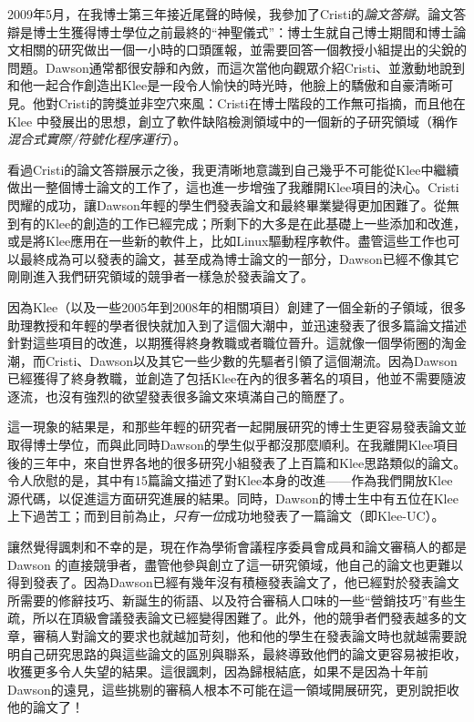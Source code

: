 \documentclass[12pt,UTF8,nofonts]{book}
\begin{document}
\breakline

2009年5月，在我博士第三年接近尾聲的時候，我參加了Cristi的\emph{論文答辯}。論文答辯是博士生獲得博士學位之前最終的“神聖儀式”：博士生就自己博士期間和博士論文相關的研究做出一個一小時的口頭匯報，並需要回答一個教授小組提出的尖銳的問題。Dawson通常都很安靜和內斂，而這次當他向觀眾介紹Cristi、並激動地說到和他一起合作創造出Klee是一段令人愉快的時光時，他臉上的驕傲和自豪清晰可見。他對Cristi的誇獎並非空穴來風：Cristi在博士階段的工作無可指摘，而且他在Klee 中發展出的思想，創立了軟件缺陷檢測領域中的一個新的子研究領域（稱作\emph{混合式實際/符號化程序運行}）。

看過Cristi的論文答辯展示之後，我更清晰地意識到自己幾乎不可能從Klee中繼續做出一整個博士論文的工作了，這也進一步增強了我離開Klee項目的決心。Cristi 閃耀的成功，讓Dawson年輕的學生們發表論文和最終畢業變得更加困難了。從無到有的Klee的創造的工作已經完成；所剩下的大多是在此基礎上一些添加和改進，或是將Klee應用在一些新的軟件上，比如Linux驅動程序軟件。盡管這些工作也可以最終成為可以發表的論文，甚至成為博士論文的一部分，Dawson已經不像其它剛剛進入我們研究領域的競爭者一樣急於發表論文了。

因為Klee（以及一些2005年到2008年的相關項目）創建了一個全新的子領域，很多助理教授和年輕的學者很快就加入到了這個大潮中，並迅速發表了很多篇論文描述針對這些項目的改進，以期獲得終身教職或者職位晉升。這就像一個學術圈的淘金潮，而Cristi、Dawson以及其它一些少數的先驅者引領了這個潮流。因為Dawson已經獲得了終身教職，並創造了包括Klee在內的很多著名的項目，他並不需要隨波逐流，也沒有強烈的欲望發表很多論文來填滿自己的簡歷了。

這一現象的結果是，和那些年輕的研究者一起開展研究的博士生更容易發表論文並取得博士學位，而與此同時Dawson的學生似乎都沒那麼順利。在我離開Klee項目後的三年中，來自世界各地的很多研究小組發表了上百篇和Klee思路類似的論文。令人欣慰的是，其中有15篇論文描述了對Klee本身的改進——作為我們開放Klee 源代碼，以促進這方面研究進展的結果。同時，Dawson的博士生中有五位在Klee上下過苦工；而到目前為止，\emph{只有一位}成功地發表了一篇論文（即Klee-UC）。

讓然覺得諷刺和不幸的是，現在作為學術會議程序委員會成員和論文審稿人的都是Dawson 的直接競爭者，盡管他參與創立了這一研究領域，他自己的論文也更難以得到發表了。因為Dawson已經有幾年沒有積極發表論文了，他已經對於發表論文所需要的修辭技巧、新誕生的術語、以及符合審稿人口味的一些“營銷技巧”有些生疏，所以在頂級會議發表論文已經變得困難了。此外，他的競爭者們發表越多的文章，審稿人對論文的要求也就越加苛刻，他和他的學生在發表論文時也就越需要說明自己研究思路的與這些論文的區別與聯系，最終導致他們的論文更容易被拒收，收獲更多令人失望的結果。這很諷刺，因為歸根結底，如果不是因為十年前Dawson的遠見，這些挑剔的審稿人根本不可能在這一領域開展研究，更別說拒收他的論文了！
\end{document}
